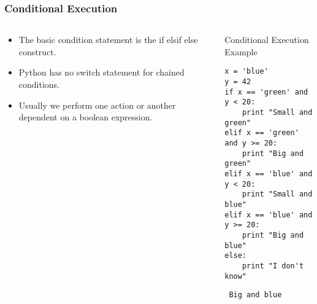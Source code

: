 \documentclass[bigger]{beamer}
\begin{document}
\begin{frame}[fragile]
\frametitle{Conditional Execution}
\label{sec-1-9}
\begin{columns}
\begin{column}{0.4\textwidth}
\label{sec-1-9-1}

\begin{itemize}
\item The basic condition statement is the if elsif else construct.
\item Python has no switch statement for chained conditions.
\item Usually we perform one action or another dependent on a boolean expression.
\end{itemize}
\end{column}
\begin{column}{0.6\textwidth}
\begin{block}{Conditional Execution Example}
\label{sec-1-9-2}

\fontsize{6}{7.2}\selectfont

\begin{verbatim}
x = 'blue'
y = 42
if x == 'green' and y < 20:
    print "Small and green"
elif x == 'green' and y >= 20:
    print "Big and green"
elif x == 'blue' and y < 20:
    print "Small and blue"
elif x == 'blue' and y >= 20:
    print "Big and blue"
else:
    print "I don't know"
\end{verbatim}

\begin{verbatim}
 Big and blue
\end{verbatim}
\end{block}
\end{column}
\end{columns}
\end{frame}
\end{document}
